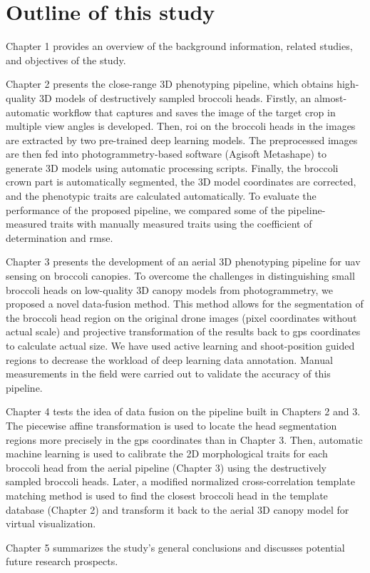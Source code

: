 \section{Outline of this study}

Chapter 1 provides an overview of the background information, related studies, and objectives of the study.

Chapter 2 presents the close-range 3D phenotyping pipeline, which obtains high-quality 3D models of destructively sampled broccoli heads. Firstly, an almost-automatic workflow that captures and saves the image of the target crop in multiple view angles is developed. Then, \gls{roi} on the broccoli heads in the images are extracted by two pre-trained deep learning models. The preprocessed images are then fed into photogrammetry-based software (Agisoft Metashape) to generate 3D models using automatic processing scripts. Finally, the broccoli crown part is automatically segmented, the 3D model coordinates are corrected, and the phenotypic traits are calculated automatically. To evaluate the performance of the proposed pipeline, we compared some of the pipeline-measured traits with manually measured traits using the coefficient of determination and \gls{rmse}.

Chapter 3 presents the development of an aerial 3D phenotyping pipeline for \gls{uav} sensing on broccoli canopies. To overcome the challenges in distinguishing small broccoli heads on low-quality 3D canopy models from photogrammetry, we proposed a novel data-fusion method. This method allows for the segmentation of the broccoli head region on the original drone images (pixel coordinates without actual scale) and projective transformation of the results back to \gls{gps} coordinates to calculate actual size. We have used active learning and shoot-position guided regions to decrease the workload of deep learning data annotation. Manual measurements in the field were carried out to validate the accuracy of this pipeline.

Chapter 4 tests the idea of data fusion on the pipeline built in Chapters 2 and 3. The piecewise affine transformation is used to locate the head segmentation regions more precisely in the \gls{gps}  coordinates than in Chapter 3. Then, automatic machine learning is used to calibrate the 2D morphological traits for each broccoli head from the aerial pipeline (Chapter 3) using the destructively sampled broccoli heads. Later, a modified normalized cross-correlation template matching method is used to find the closest broccoli head in the template database (Chapter 2) and transform it back to the aerial 3D canopy model for virtual visualization.

Chapter 5 summarizes the study's general conclusions and discusses potential future research prospects.